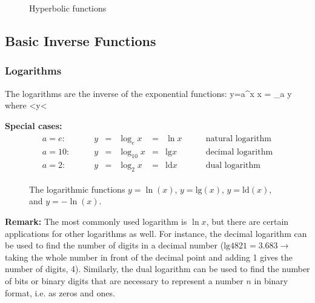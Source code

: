 \begin{figure}[!h]
    \centering
    \hspace*{0.5cm}
     \svs
    \caption{Hyperbolic functions} \label{fig14}
\end{figure} \vs



\subsection{Basic Inverse Functions}
\subsubsection{Logarithms}
The logarithms are the inverse of the exponential functions:
\bnn y=a^x \quad \leftrightarrow \quad x = \log_a y  \qquad\mbox{where} <y<\infty \enn

{\bf Special cases:}
\begin{eqnarray*}
\begin{array}{lcccccc}
a=e: \qquad & y & = & \log_e x & = & \ln x & \qquad\mbox{natural logarithm}\\
a=10: \qquad & y & = & \log_{10} x & = & \mbox{lg} x & \qquad\mbox{decimal logarithm}\\
a=2: \qquad  & y & = & \log_2 x & = & \mbox{ld} x & \qquad\mbox{dual logarithm}
\end{array}
\end{eqnarray*}

\begin{figure}[!h]
    \centerline{\epsfxsize=10cm  } \svs
   \caption{The logarithmic functions $y=\ln(x)$, $y=\mbox{lg}(x)$, $y=\mbox{ld}(x)$, and $y=-\ln(x)$.} \label{fig15}
\end{figure} \vs

{\bf Remark:} The most commonly used logarithm is $\ln x$, but there are certain applications for other 
logarithms as well. For instance, the decimal logarithm can be used to find the number of digits in 
a decimal number 
($\mbox{lg} 4821=3.683 \rightarrow$  taking the whole number in front of the decimal point and 
adding 1 gives the number of digits, 4). Similarly, the dual logarithm can be used to find the number
of bits or binary digits that are necessary to represent a number $n$ in binary format, i.e. as 
zeros and ones.  


